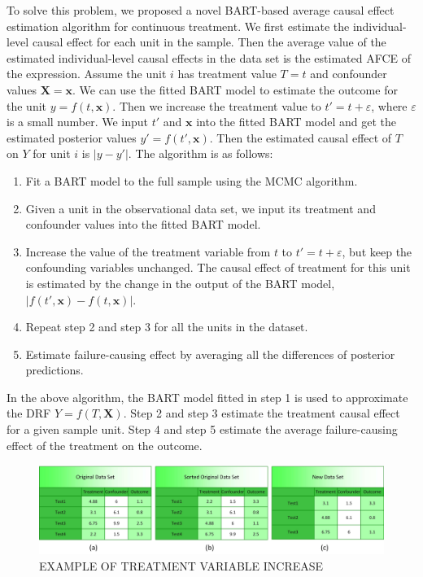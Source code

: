 To solve this problem, we proposed a novel BART-based average causal effect estimation algorithm for continuous treatment. We first estimate the individual-level causal effect for  each unit in the sample. Then the average value of the estimated individual-level causal effects in the data set is the estimated AFCE of the expression.  Assume the unit $i$ has treatment value $T=t$ and confounder values $\pmb {X}=\pmb {x}$. We can use the fitted BART model to estimate the outcome for the unit $y=f(t,\pmb{x})$. Then we increase the treatment value to $t'=t+\varepsilon$, where $\varepsilon $ is a small number. We input $t'$ and $\pmb{x}$ into the fitted BART model and get the estimated posterior values $y'=f(t',\pmb{x})$. Then the estimated causal effect of $T$ on $Y$ for unit $i$ is $\left| {y - y'} \right|$. The algorithm is as follows:
\begin{enumerate}
\item Fit a BART model to the full sample using the MCMC algorithm.
\item Given a unit in the observational data set, we input its treatment and confounder values into the fitted BART model. 
\item Increase the value of the treatment variable from $t$ to $t'=t+\varepsilon$, but keep the confounding variables unchanged. The causal effect of treatment for this unit is estimated by the change in the output of the BART model, $|f(t',\pmb{x})-f(t,\pmb{x})|$.
\item Repeat step 2 and step 3 for all the units in the dataset.
\item Estimate failure-causing effect by averaging all the differences of posterior predictions.
\end{enumerate}

In the above algorithm, the BART model fitted in step 1 is used to approximate the DRF $Y=f(T,\pmb{X})$. Step 2 and step 3 estimate the treatment causal effect for a given sample unit. Step 4 and step 5 estimate the average failure-causing effect of the treatment on the outcome.

\begin{figure}[!thpb]
\centering
\includegraphics[width=1\textwidth]{chapter4_BART_ACE.pdf}
\caption{EXAMPLE OF TREATMENT VARIABLE INCREASE}
\label{bartace}
\end{figure}


